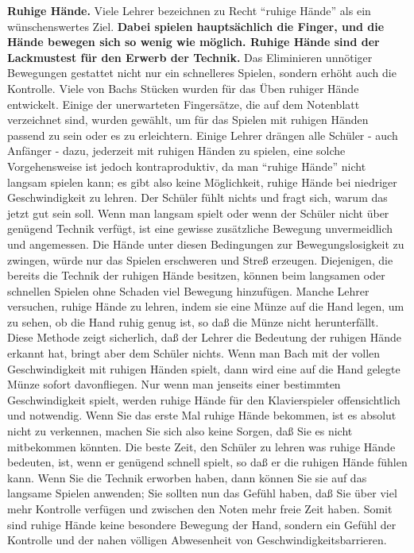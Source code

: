\textbf{Ruhige Hände.}
Viele Lehrer bezeichnen zu Recht \enquote{ruhige Hände} als ein wünschenswertes Ziel.
\textbf{Dabei spielen hauptsächlich die Finger, und die Hände bewegen sich so wenig wie möglich.
Ruhige Hände sind der Lackmustest für den Erwerb der Technik.}
Das Eliminieren unnötiger Bewegungen gestattet nicht nur ein schnelleres Spielen, sondern erhöht auch die Kontrolle.
Viele von Bachs Stücken wurden für das Üben ruhiger Hände entwickelt.
Einige der unerwarteten Fingersätze, die auf dem Notenblatt verzeichnet sind, wurden gewählt, um für das Spielen mit ruhigen Händen passend zu sein oder es zu erleichtern.
Einige Lehrer drängen alle Schüler - auch Anfänger - dazu, jederzeit mit ruhigen Händen zu spielen, eine solche Vorgehensweise ist jedoch kontraproduktiv, da man \enquote{ruhige Hände} nicht langsam spielen kann; es gibt also keine Möglichkeit, ruhige Hände bei niedriger Geschwindigkeit zu lehren.
Der Schüler fühlt nichts und fragt sich, warum das jetzt gut sein soll.
Wenn man langsam spielt oder wenn der Schüler nicht über genügend Technik verfügt, ist eine gewisse zusätzliche Bewegung unvermeidlich und angemessen.
Die Hände unter diesen Bedingungen zur Bewegungslosigkeit zu zwingen, würde nur das Spielen erschweren und Streß erzeugen.
Diejenigen, die bereits die Technik der ruhigen Hände besitzen, können beim langsamen oder schnellen Spielen ohne Schaden viel Bewegung hinzufügen.
Manche Lehrer versuchen, ruhige Hände zu lehren, indem sie eine Münze auf die Hand legen, um zu sehen, ob die Hand ruhig genug ist, so daß die Münze nicht herunterfällt.
Diese Methode zeigt sicherlich, daß der Lehrer die Bedeutung der ruhigen Hände erkannt hat, bringt aber dem Schüler nichts.
Wenn man Bach mit der vollen Geschwindigkeit mit ruhigen Händen spielt, dann wird eine auf die Hand gelegte Münze sofort davonfliegen.
Nur wenn man jenseits einer bestimmten Geschwindigkeit spielt, werden ruhige Hände für den Klavierspieler offensichtlich und notwendig.
Wenn Sie das erste Mal ruhige Hände bekommen, ist es absolut nicht zu verkennen, machen Sie sich also keine Sorgen, daß Sie es nicht mitbekommen könnten.
Die beste Zeit, den Schüler zu lehren was ruhige Hände bedeuten, ist, wenn er genügend schnell spielt, so daß er die ruhigen Hände fühlen kann.
Wenn Sie die Technik erworben haben, dann können Sie sie auf das langsame Spielen anwenden; Sie sollten nun das Gefühl haben, daß Sie über viel mehr Kontrolle verfügen und zwischen den Noten mehr freie Zeit haben.
Somit sind ruhige Hände keine besondere Bewegung der Hand, sondern ein Gefühl der Kontrolle und der nahen völligen Abwesenheit von Geschwindigkeitsbarrieren.


